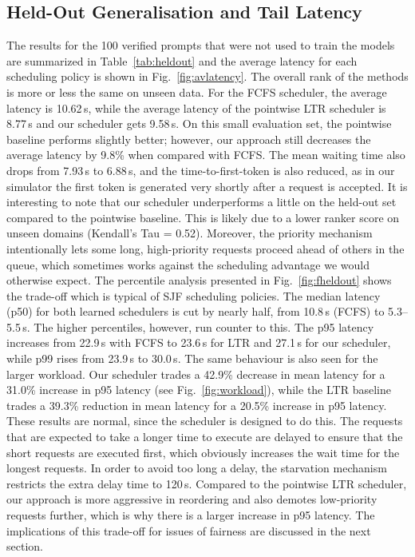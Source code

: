 \documentclass[conference]{IEEEtran}
\begin{document}
\subsection{Held-Out Generalisation and Tail Latency}
The results for the 100 verified prompts that were not used to train the models are summarized in Table~\ref{tab:heldout} and the average latency for each scheduling policy is shown in Fig.~\ref{fig:avlatency}. The overall rank of the methods is more or less the same on unseen data. For the FCFS scheduler, the average latency is 10.62\,s, while the average latency of the pointwise LTR scheduler is 8.77\,s and our scheduler gets 9.58\,s. On this small evaluation set, the pointwise baseline performs slightly better; however, our approach still decreases the average latency by 9.8\% when compared with FCFS. The mean waiting time also drops from 7.93\,s to 6.88\,s, and the time-to-first-token is also reduced, as in our simulator the first token is generated very shortly after a request is accepted.
It is interesting to note that our scheduler underperforms a little on the held-out set compared to the pointwise baseline. This is likely due to a lower ranker score on unseen domains (Kendall's Tau = 0.52). Moreover, the priority mechanism intentionally lets some long, high-priority requests proceed ahead of others in the queue, which sometimes works against the scheduling advantage we would otherwise expect.
The percentile analysis presented in Fig.~\ref{fig:fheldout} shows the trade-off which is typical of SJF scheduling policies. The median latency (p50) for both learned schedulers is cut by nearly half, from 10.8\,s (FCFS) to 5.3--5.5\,s. The higher percentiles, however, run counter to this. The p95 latency increases from 22.9\,s with FCFS to 23.6\,s for LTR and 27.1\,s for our scheduler, while p99 rises from 23.9\,s to 30.0\,s. The same behaviour is also seen for the larger workload. Our scheduler trades a 42.9\% decrease in mean latency for a 31.0\% increase in p95 latency (see Fig.~\ref{fig:workload}), while the LTR baseline trades a 39.3\% reduction in mean latency for a 20.5\% increase in p95 latency.
These results are normal, since the scheduler is designed to do this. The requests that are expected to take a longer time to execute are delayed to ensure that the short requests are executed first, which obviously increases the wait time for the longest requests. In order to avoid too long a delay, the starvation mechanism restricts the extra delay time to 120\,s. Compared to the pointwise LTR scheduler, our approach is more aggressive in reordering and also demotes low-priority requests further, which is why there is a larger increase in p95 latency. The implications of this trade-off for issues of fairness are discussed in the next section.
\end{document}
